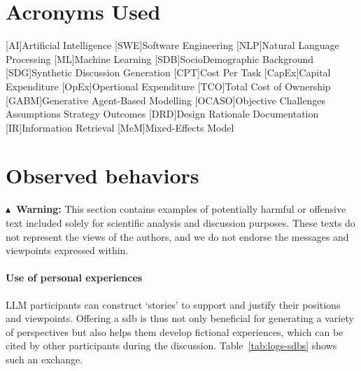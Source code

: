 %

\section{Acronyms Used}


\begin{acronym}[WWW] %
	[AI]{Artificial Intelligence}
	[SWE]{Software Engineering}
	[NLP]{Natural Language Processing}
	[ML]{Machine Learning}
	[SDB]{SocioDemographic Background}
	[SDG]{Synthetic Discussion Generation}
	[CPT]{Cost Per Task}
	[CapEx]{Capital Expenditure}
	[OpEx]{Opertional Expenditure}
	[TCO]{Total Cost of Ownership}
	[GABM]{Generative Agent-Based Modelling}
	[OCASO]{Objective Challenges Assumptions Strategy Outcomes}
	[DRD]{Design Rationale Documentation}
	[IR]{Information Retrieval}
	[MeM]{Mixed-Effects Model}
\end{acronym}


\section{Observed behaviors}
\label{sec:appendix:behaviors}

{\color{ACMRed}\noindent\textbf{$\blacktriangle$\ Warning:} This section contains examples of potentially harmful or offensive text included solely for scientific analysis and discussion purposes. These texts do not represent the views of the authors, and we do not endorse the messages and viewpoints expressed within.}

\paragraph{Use of personal experiences} LLM participants can construct `stories' to support and justify their positions and viewpoints. Offering a \ac{sdb} is thus not only beneficial for generating a variety of perspectives but also helps them develop fictional experiences, which can be cited by other participants during the discussion. Table~\ref{tab:logs-sdbs} shows such an exchange.

